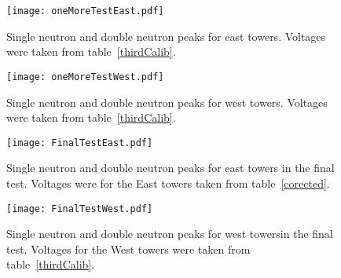 \documentclass[a4paper,10pt]{report}
\begin{document}
\begin{figure}[!htb]
\begin{center}
\texttt{[image: oneMoreTestEast.pdf]}
\end{center}
\caption{Single neutron and double neutron peaks for east towers.
Voltages were taken from table~\ref{thirdCalib}.}
\label{oneMoreTestEast}
\end{figure}

\begin{figure}[!htb]
\begin{center}
\texttt{[image: oneMoreTestWest.pdf]}
\end{center}
\caption{Single neutron and double neutron peaks for west towers. 
Voltages were taken from table~\ref{thirdCalib}.}
\label{oneMoreTestWest}
\end{figure}

\begin{figure}[!htb]
\begin{center}
\texttt{[image: FinalTestEast.pdf]}
\end{center}
\caption{Single neutron and double neutron peaks for east towers in the final test. Voltages were
for the East towers taken from table~\ref{corected}.}
\label{finalTestEast}
\end{figure}

\begin{figure}[!htb]
\begin{center}
\texttt{[image: FinalTestWest.pdf]}
\end{center}
\caption{Single neutron and double neutron peaks for west towersin the final test. Voltages
for the West towers were taken from table~\ref{thirdCalib}.}
\label{finalTestWest}
\end{figure}
\end{document}
